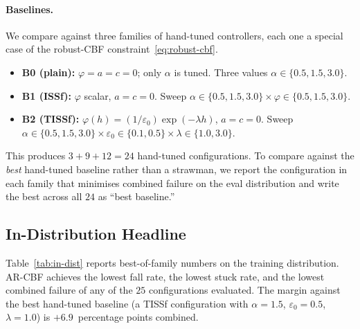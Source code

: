 \documentclass{article}
\newcommand{\methodname}{\textsc{AR-CBF}}  %
\begin{document}
\paragraph{Baselines.} We compare against three families of hand-tuned
controllers, each one a special case of the robust-CBF
constraint~\eqref{eq:robust-cbf}.
\begin{itemize}[leftmargin=*,itemsep=2pt,topsep=2pt]
\item \textbf{B0 (plain):} $\varphi=a=c=0$; only $\alpha$ is tuned. Three
      values $\alpha\in\{0.5,1.5,3.0\}$.
\item \textbf{B1 (ISSf):} $\varphi$ scalar, $a=c=0$. Sweep
      $\alpha\in\{0.5,1.5,3.0\}\times\varphi\in\{0.5,1.5,3.0\}$.
\item \textbf{B2 (TISSf):} $\varphi(h)=(1/\varepsilon_0)\exp(-\lambda h)$,
      $a=c=0$. Sweep $\alpha\in\{0.5,1.5,3.0\}\times\varepsilon_0\in\{0.1,0.5\}\times\lambda\in\{1.0,3.0\}$.
\end{itemize}
This produces $3+9+12=24$ hand-tuned configurations. To compare against the
\emph{best} hand-tuned baseline rather than a strawman, we report the
configuration in each family that minimises combined failure on the eval
distribution and write the best across all $24$ as ``best baseline.''

\subsection{In-Distribution Headline}
\label{sec:headline}

Table~\ref{tab:in-dist} reports best-of-family numbers on the training
distribution. \methodname{} achieves the lowest fall rate, the lowest stuck
rate, and the lowest combined failure of any of the $25$ configurations
evaluated. The margin against the best hand-tuned baseline (a TISSf
configuration with $\alpha=1.5$, $\varepsilon_0=0.5$, $\lambda=1.0$) is
$+6.9$~percentage points combined.
\end{document}
